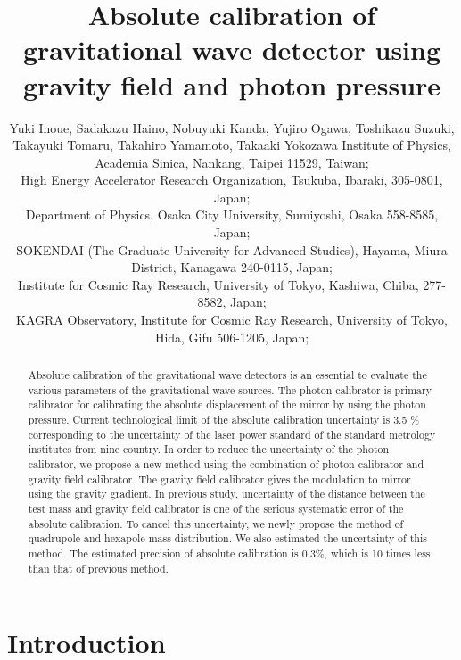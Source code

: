 \documentclass[A4]{spie}  %
\title{Absolute calibration of gravitational wave detector using gravity field and photon pressure}
\author{Yuki Inoue\supit{a,b}, Sadakazu Haino\supit{a}, Nobuyuki Kanda\supit{c}, Yujiro Ogawa\supit{b.d}, Toshikazu Suzuki\supit{b,e}, Takayuki Tomaru\supit{b,d,e}, Takahiro Yamamoto\supit{f}, Takaaki Yokozawa\supit{f}
\skiplinehalf
\supit{a}Institute of Physics, Academia Sinica, Nankang, Taipei 11529, Taiwan; \\
\supit{b}High Energy Accelerator Research Organization, Tsukuba, Ibaraki, 305-0801, Japan;\\
\supit{c}Department of Physics, Osaka City University, Sumiyoshi, Osaka 558-8585, Japan;\\
\supit{d}SOKENDAI (The Graduate University for Advanced Studies), Hayama, Miura District, Kanagawa 240-0115, Japan;\\
\supit{e}Institute for Cosmic Ray Research, University of Tokyo, Kashiwa, Chiba, 277-8582, Japan;\\
\supit{f}KAGRA Observatory, Institute for Cosmic Ray Research, University of Tokyo, Hida, Gifu 506-1205, Japan;\\
}
\begin{document}
 
\maketitle 

\begin{abstract}
Absolute calibration of the gravitational wave detectors is an essential to evaluate the various parameters of the gravitational wave sources. 
The photon calibrator is primary calibrator for calibrating the absolute displacement of the mirror by using the photon pressure. 
Current technological limit of the absolute calibration uncertainty is 3.5 \% corresponding to the uncertainty of the laser power standard of the standard metrology institutes from nine country.  In order to reduce the uncertainty of the photon calibrator, we propose a new method using the combination of photon calibrator and gravity field calibrator. The gravity field calibrator gives the modulation to mirror using the gravity gradient. In previous study, uncertainty of the distance between the test mass and gravity field calibrator is one of the serious systematic error of the absolute calibration. To cancel this uncertainty, we newly propose the method of quadrupole and hexapole mass distribution.  We also estimated the uncertainty of this method. The estimated precision of absolute calibration is 0.3\%, which is 10 times less than that of previous method.

\end{abstract}



\section{Introduction}
\end{document}
